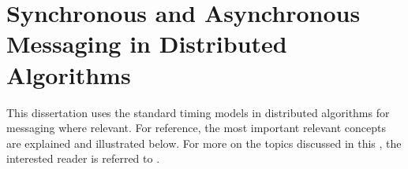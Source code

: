 \section{\label{sec:back:syncasync}Synchronous and Asynchronous Messaging in Distributed Algorithms}



This dissertation uses the standard timing models in distributed algorithms \cite{Lynch1996} for messaging where relevant.  For reference, the most important relevant concepts are explained and illustrated below.  For more on the topics discussed in this , the interested reader is referred to \cite{Fokkink2013,Lynch1996,Tel2000}.

